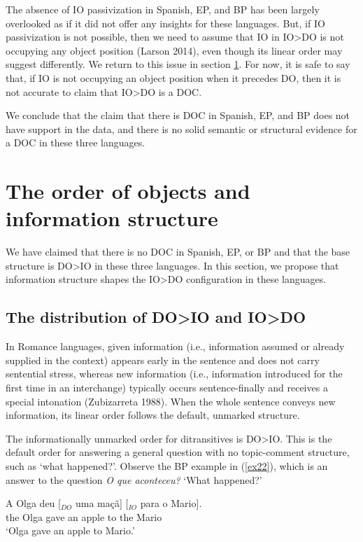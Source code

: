 \documentclass[output=paper,modfonts,nonflat]{langsci/langscibook}
\begin{document}
The absence of IO passivization in Spanish, EP, and BP has been largely overlooked as if it did not offer any insights for these languages. But, if IO passivization is not possible, then we need to assume that IO in IO>DO is not occupying any object position (Larson 2014), even though its linear order may suggest differently. We return to this issue in section \ref{section3}. For now, it is safe to say that, if IO is not occupying an object position when it precedes DO, then it is not accurate to claim that IO>DO is a DOC.

We conclude that the claim that there is DOC in Spanish, EP, and BP does not have support in the data, and there is no solid semantic or structural evidence for a DOC in these three languages. 

\section{The order of objects and information structure}\label{section3}
We have claimed that there is no DOC in Spanish, EP, or BP and that the base structure is DO>IO in these three languages. In this section, we propose that information structure shapes the IO>DO configuration in these languages.

\subsection{The distribution of DO>IO and IO>DO}\label{section3.1}
In Romance languages, given information (i.e., information assumed or already supplied in the context) appears early in the sentence and does not carry sentential stress, whereas new information (i.e., information introduced for the first time in an interchange) typically occurs sentence-finally and receives a special intonation (Zubizarreta 1988). When the whole sentence conveys new information, its linear order follows the default, unmarked structure.

The informationally unmarked order for ditransitives is DO>IO. This is the default order for answering a general question with no topic-comment structure, such as ‘what happened?’. Observe the BP example in (\ref{ex22}), which is an answer to the question \textit{O que aconteceu?} ‘What happened?’

\ea \label{ex22}
	\gll A   Olga deu [$_{DO}$ uma maçã] [$_{IO}$ para o   Mario].\\
			the Olga gave \hspaceThis{[$_{DO}$} an apple \hspaceThis{[$_{IO}$} to the Mario\\
	\glt ‘Olga gave an apple to Mario.’
\z
\end{document}
